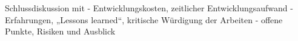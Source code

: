 \documentclass[../../main.tex]{subfiles}
\begin{document}
Schlussdiskussion mit
- Entwicklungskosten, zeitlicher Entwicklungsaufwand
- Erfahrungen, „Lessons learned“, kritische Würdigung der Arbeiten
- offene Punkte, Risiken und Ausblick 
\end{document}

